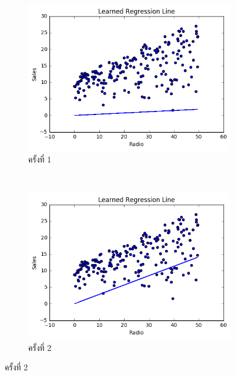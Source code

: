 \begin{figure}[H]
    \centering
    \begin{subfigure}{0.8\textwidth}
        \centering
        \includegraphics[width=0.9\linewidth]{fig/plot_simple_reg_1.png}
        \caption{ครั้งที่ 1}
        \label{fig:plot_simple_reg_1}
    \end{subfigure}
    \\
    \begin{subfigure}{0.8\textwidth}
        \centering
        \includegraphics[width=0.9\linewidth]{fig/plot_simple_reg_2.png}
        \caption{ครั้งที่ 2}
        \label{fig:plot_simple_reg_2}
    \end{subfigure}
\end{figure}%
